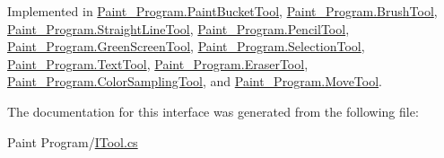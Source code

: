Implemented in \mbox{\hyperlink{class_paint___program_1_1_paint_bucket_tool_ac1955b19a9fd31aaaca0bc07cef54957}{Paint\+\_\+\+Program.\+Paint\+Bucket\+Tool}}, \mbox{\hyperlink{class_paint___program_1_1_brush_tool_ab66c41c9ec1f7175fd0a073cf1dacae9}{Paint\+\_\+\+Program.\+Brush\+Tool}}, \mbox{\hyperlink{class_paint___program_1_1_straight_line_tool_a42d3d814c74e317160779fbe9df3531b}{Paint\+\_\+\+Program.\+Straight\+Line\+Tool}}, \mbox{\hyperlink{class_paint___program_1_1_pencil_tool_a96ceb2ad71f16fbb361024f58665f6a3}{Paint\+\_\+\+Program.\+Pencil\+Tool}}, \mbox{\hyperlink{class_paint___program_1_1_green_screen_tool_a3d474370bf269af763ff6edceebd2000}{Paint\+\_\+\+Program.\+Green\+Screen\+Tool}}, \mbox{\hyperlink{class_paint___program_1_1_selection_tool_ad541275f644867e4fb0d95db8a723b14}{Paint\+\_\+\+Program.\+Selection\+Tool}}, \mbox{\hyperlink{class_paint___program_1_1_text_tool_a7fdf6ff8d7fa9bf43cbb4c6668862f2c}{Paint\+\_\+\+Program.\+Text\+Tool}}, \mbox{\hyperlink{class_paint___program_1_1_eraser_tool_a0776bb064faa9462f0f224f461a56f31}{Paint\+\_\+\+Program.\+Eraser\+Tool}}, \mbox{\hyperlink{class_paint___program_1_1_color_sampling_tool_a0f2d672005a62b9ac04889c7a14cfcd0}{Paint\+\_\+\+Program.\+Color\+Sampling\+Tool}}, and \mbox{\hyperlink{class_paint___program_1_1_move_tool_aae2ece279f35913a1108e3c8a93996c3}{Paint\+\_\+\+Program.\+Move\+Tool}}.



The documentation for this interface was generated from the following file\+:\begin{DoxyCompactItemize}
\item 
Paint Program/\mbox{\hyperlink{_i_tool_8cs}{I\+Tool.\+cs}}\end{DoxyCompactItemize}
